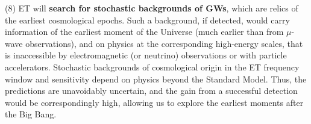 (8) ET will \textbf{search for stochastic backgrounds of GWs}, which are relics of the
earliest cosmological epochs.  Such a background, if detected, would carry
information of the earliest moment of the Universe (much earlier than from $\mu$-wave observations), and on physics at the
corresponding high-energy scales, that is inaccessible  by electromagnetic
(or neutrino) observations or with particle accelerators. Stochastic
backgrounds of cosmological origin in the ET frequency window and sensitivity depend on physics beyond the Standard Model. Thus, the predictions are unavoidably uncertain, and
the gain from a successful detection would be correspondingly high, allowing us
to explore the earliest moments after the Big Bang.

